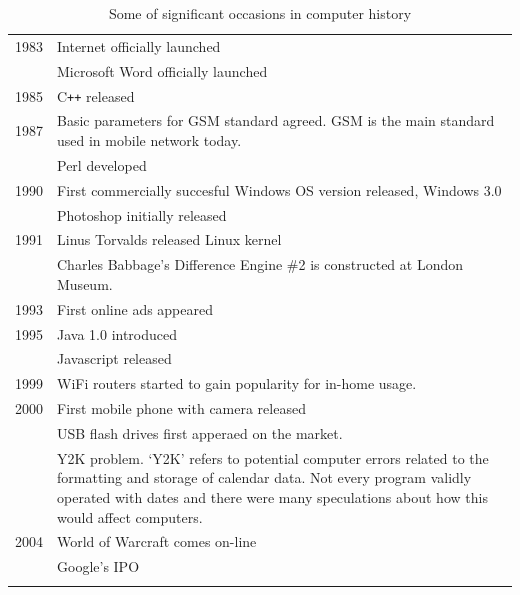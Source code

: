 \documentclass{article}
\begin{document}
\begin{longtable}{p{}p{}}
                \midrule
                1983 & Internet officially launched \\
                \cmidrule(r){2-2}
                     & Microsoft Word officially launched \\
                \midrule
                1985 & C\texttt{++} released \\
                \midrule
                1987 & Basic parameters for GSM standard agreed. GSM is the main standard used in mobile network today. \\
                \cmidrule(r){2-2}
                     & Perl developed\\
                \midrule
                1990 & First commercially succesful Windows OS version released, Windows 3.0 \\
                \cmidrule(r){2-2}
                     & Photoshop initially released \\
                \midrule
                1991 & Linus Torvalds released Linux kernel \\
                \cmidrule(r){2-2}
                     & Charles Babbage's Difference Engine \#2 is constructed at London Museum. \\
                \midrule
                1993 & First online ads appeared \\
                \midrule
                1995 & Java 1.0 introduced \\
                \cmidrule(r){2-2}
                     & Javascript released \\
                \midrule
                1999 & WiFi routers started to gain popularity for in-home usage. \\
                \midrule
                2000 & First mobile phone with camera released \\
                \cmidrule(r){2-2}
                     & USB flash drives first apperaed on the market. \\
                \cmidrule(r){2-2}
                     & Y2K problem. `Y2K' refers to potential computer errors related to the formatting and storage of calendar data. Not every program validly operated 
                        with dates and there were many speculations about how this would affect computers.\\
                \midrule
                2004 & World of Warcraft comes on-line \\
                \cmidrule(r){2-2}
                     & Google's IPO\\
                
                \bottomrule
                
                \caption{Some of significant occasions in computer history}
            \end{longtable}
\end{document}
